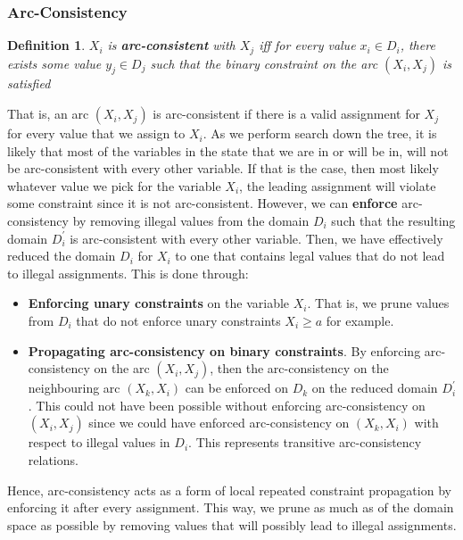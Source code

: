 \documentclass[12pt]{article}
\newtheorem{definition}{Definition}
\begin{document}
\subsubsection{Arc-Consistency}

\begin{definition}
$X_i$ is \textbf{arc-consistent} with $X_j$ iff for every value $x_i \in D_i$, there exists some value $y_j \in D_j$ such that the binary constraint on the arc $(X_i, X_j)$ is satisfied
\end{definition}

That is, an arc $(X_i, X_j)$ is arc-consistent if there is a valid assignment for $X_j$ for every value that we assign to $X_i$. As we perform search down the tree, it is likely that most of the variables in the state that we are in or will be in, will not be arc-consistent with every other variable. If that is the case, then most likely whatever value we pick for the variable $X_i$, the leading assignment will violate some constraint since it is not arc-consistent. However, we can \textbf{enforce} arc-consistency by removing illegal values from the domain $D_i$ such that the resulting domain $D_{i}^{'}$ is arc-consistent with every other variable. Then, we have effectively reduced the domain $D_i$ for $X_i$ to one that contains legal values that do not lead to illegal assignments. This is done through:

\begin{itemize}
\item \textbf{Enforcing unary constraints} on the variable $X_i$. That is, we prune values from $D_i$ that do not enforce unary constraints $X_i \geq a$ for example.
\item \textbf{Propagating arc-consistency on binary constraints}. By enforcing arc-consistency on the arc $(X_i, X_j)$, then the arc-consistency on the neighbouring arc $(X_k, X_i)$  can be enforced on $D_k$ on the reduced domain $D_{i}^{'}$. This could not have been possible without enforcing arc-consistency on $(X_i, X_j)$ since we could have enforced arc-consistency on $(X_k, X_i)$ with respect to illegal values in $D_i$. This represents transitive arc-consistency relations.
\end{itemize}

Hence, arc-consistency acts as a form of local repeated constraint propagation by enforcing it after every assignment. This way, we prune as much as of the domain space as possible by removing values that will possibly lead to illegal assignments.
\end{document}
